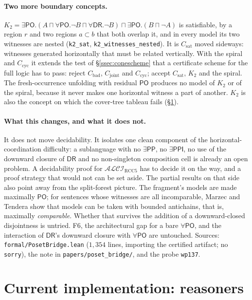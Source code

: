 \documentclass[11pt]{article}
\newcommand{\ALCIRCC}[1]{\mathcal{ALCI}_{\mathrm{RCC#1}}}
\newcommand{\DR}{\mathsf{DR}}
\newcommand{\PO}{\mathsf{PO}}
\newcommand{\PP}{\mathsf{PP}}
\newcommand{\PPI}{\mathsf{PPI}}
\newcommand{\code}[1]{\texttt{#1}}
\theoremstyle{plain}
\theoremstyle{definition}
\begin{document}
\paragraph{Two more boundary concepts.}
$K_2=\exists\PO.(A\sqcap\forall\PO.\neg B\sqcap\forall\DR.\neg B)\sqcap
\exists\PO.(B\sqcap\neg A)$ is satisfiable, by a region $r$ and two regions
$a\subset b$ that both overlap it, and in every model its two witnesses are
nested (\code{k2\_sat}, \code{k2\_witnesses\_nested}). It is
$C_{\mathrm{sat}}$ moved sideways: witnesses generated horizontally that must
be related vertically. With the spiral and $C_{\mathrm{cyc}}$ it extends the
test of \S\ref{ssec:conescheme} that a certificate scheme for the full logic
has to pass: reject $C_{\mathrm{bad}}$, $C_{\mathrm{joint}}$ and
$C_{\mathrm{cyc}}$; accept $C_{\mathrm{sat}}$, $K_2$ and the spiral. The
fresh-occurrence unfolding with residual $\PO$ produces no model of $K_2$ or
of the spiral, because it never makes one horizontal witness a part of
another. $K_2$ is also the concept on which the cover-tree tableau fails
(\S\ref{sec:reasoners}).

\paragraph{What this changes, and what it does not.} It does not move
decidability. It isolates one clean component of the horizontal-coordination
difficulty: a sublanguage with no $\exists\PP$, no $\exists\PPI$, no use of
the downward closure of $\DR$ and no non-singleton composition cell is already
an open problem. A decidability proof for $\ALCIRCC5$ has to decide it on the
way, and a proof strategy that would not can be set aside. The partial results
on that side also point away from the split-forest picture. The fragment's
models are made maximally $\PO$; for sentences whose witnesses are all
incomparable, Marzec and Tendera show that models can be taken with bounded
antichains, that is, maximally \emph{comparable}. Whether that survives the
addition of a downward-closed disjointness is untried. F6, the architectural
gap for a bare $\forall\PO$, and the interaction of $\DR$'s downward closure
with $\forall\PO$ are untouched. Sources: \texttt{formal/PosetBridge.lean}
($1{,}354$ lines, importing the certified artifact; no \code{sorry}), the note
in \texttt{papers/poset\_bridge/}, and the probe \texttt{wp137}.

\section{Current implementation: reasoners}
\label{sec:reasoners}
\end{document}
